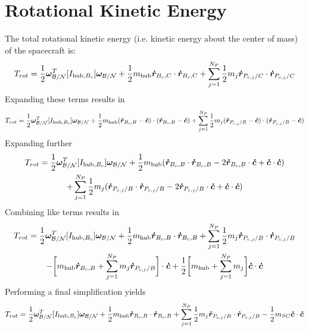 \documentclass[]{BasiliskReportMemo}
\begin{document}
\section{Rotational Kinetic Energy}
The total rotational kinetic energy (i.e. kinetic energy about the center of mass) of
the spacecraft is:
\begin{equation}
T_{rot}=\frac{1}{2}\bm\omega_{\cal B/N}^T [I_{\text{hub},B_c}] \bm\omega_{\cal B/N}+\frac{1}{2}m_{\text{hub}}\bm{\dot{r}}_{B_c,C}\cdot\bm{\dot{r}}_{B_c,C}+\sum\limits_{j=1}^{N_P} \frac{1}{2} m_j \bm{\dot{r}}_{P_{c,j}/C}\cdot\bm{\dot{r}}_{P_{c,j}/C}
\label{eq:RKE1}
\end{equation}
Expanding these terms results in
\begin{equation}
T_{rot}=\frac{1}{2}\bm\omega_{\cal B/N}^T [I_{\text{hub},B_c}] \bm\omega_{\cal B/N}+\frac{1}{2}m_{\text{hub}}(\bm{\dot{r}}_{B_c,B}-\bm{\dot{c}})\cdot(\bm{\dot{r}}_{B_c,B}-\bm{\dot{c}})+\sum\limits_{j=1}^{N_P} \frac{1}{2} m_j (\bm{\dot{r}}_{P_{c,j}/B}-\bm{\dot{c}})\cdot(\bm{\dot{r}}_{P_{c,j}/B}-\bm{\dot{c}})
\label{eq:RKE2}
\end{equation}
Expanding further
\begin{multline}
T_{rot}=\frac{1}{2}\bm\omega_{\cal B/N}^T [I_{\text{hub},B_c}] \bm\omega_{\cal B/N}+\frac{1}{2}m_{\text{hub}}(\bm{\dot{r}}_{B_c,B}\cdot\bm{\dot{r}}_{B_c,B}-2\bm{\dot{r}}_{B_c,B}\cdot\bm{\dot{c}}+\bm{\dot{c}}\cdot\bm{\dot{c}})\\+\sum\limits_{j=1}^{N_P} \frac{1}{2} m_j (\bm{\dot{r}}_{P_{c,j}/B}\cdot\bm{\dot{r}}_{P_{c,j}/B}-2\bm{\dot{r}}_{P_{c,j}/B}\cdot\bm{\dot{c}}+\bm{\dot{c}}\cdot\bm{\dot{c}})
\label{eq:RKE3}
\end{multline}
Combining like terms results in
\begin{multline}
T_{rot}=\frac{1}{2}\bm\omega_{\cal B/N}^T [I_{\text{hub},B_c}] \bm\omega_{\cal B/N}+\frac{1}{2}m_{\text{hub}}\bm{\dot{r}}_{B_c,B}\cdot\bm{\dot{r}}_{B_c,B}+\sum\limits_{j=1}^{N_P} \frac{1}{2} m_j \bm{\dot{r}}_{P_{c,j}/B}\cdot\bm{\dot{r}}_{P_{c,j}/B}\\-\bigg[m_{\text{hub}}\bm{\dot{r}}_{B_c,B}+\sum\limits_{j=1}^{N_P} m_j \bm{\dot{r}}_{P_{c,j}/B}\bigg]\cdot\bm{\dot{c}}+\frac{1}{2}\bigg[m_{\text{hub}}+\sum\limits_{j=1}^{N_P} m_j \bigg]\bm{\dot{c}}\cdot\bm{\dot{c}}
\label{eq:RKE3_1}
\end{multline}
Performing a final simplification yields
\begin{equation}
T_{rot}=\frac{1}{2}\bm\omega_{\cal B/N}^T [I_{\text{hub},B_c}] \bm\omega_{\cal B/N}+\frac{1}{2}m_{\text{hub}}\bm{\dot{r}}_{B_c,B}\cdot\bm{\dot{r}}_{B_c,B}+\sum\limits_{j=1}^{N_P} \frac{1}{2} m_j \bm{\dot{r}}_{P_{c,j}/B}\cdot\bm{\dot{r}}_{P_{c,j}/B}-\frac{1}{2}m_{SC}\bm{\dot{c}}\cdot\bm{\dot{c}}
\label{eq:RKE4}
\end{equation} \\
\end{document}
